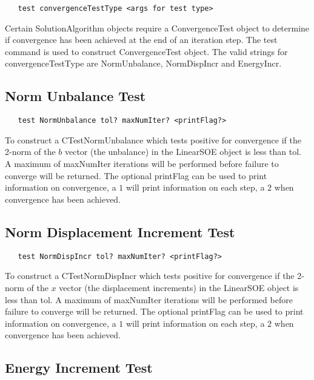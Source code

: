 \documentclass[12pt]{article}
\begin{document}
{\sf\small
\begin{verbatim}
   test convergenceTestType <args for test type>
\end{verbatim}
}

Certain SolutionAlgorithm objects require a ConvergenceTest object to
determine if convergence has been achieved at the end of an iteration
step. The test command is used to construct ConvergenceTest object. The
valid strings for convergenceTestType are NormUnbalance, NormDispIncr
and EnergyIncr.

\subsection{Norm Unbalance Test}

{\sf\small
\begin{verbatim}
   test NormUnbalance tol? maxNumIter? <printFlag?>
\end{verbatim}
}

\noindent To construct a CTestNormUnbalance which tests positive for
convergence if the 2-norm of the $b$ vector (the unbalance) in the
LinearSOE object is less than tol. A maximum of maxNumIter iterations
will be performed before failure to converge will be returned. The
optional printFlag can be used to print information on convergence, a
$1$ will print information on each step, a $2$ when convergence has
been achieved.

\subsection{Norm Displacement Increment Test}

{\sf\small
\begin{verbatim}
   test NormDispIncr tol? maxNumIter? <printFlag?>
\end{verbatim}
}

\noindent To construct a CTestNormDispIncr which tests positive for
convergence if the 2-norm of the $x$ vector (the displacement increments)
in the LinearSOE object is less than tol. A maximum of maxNumIter iterations
will be performed before failure to converge will be returned. The
optional printFlag can be used to print information on convergence, a
$1$ will print information on each step, a $2$ when convergence has
been achieved.

\subsection{Energy Increment Test}
\end{document}
